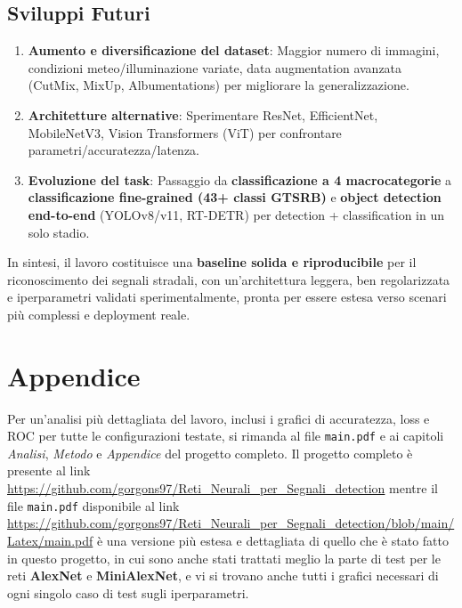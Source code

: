 \documentclass[openany,italian,12pt]{article}
\begin{document}
\subsection*{Sviluppi Futuri}
\begin{enumerate}
    \item \textbf{Aumento e diversificazione del dataset}: Maggior numero di immagini, condizioni meteo/illuminazione variate, data augmentation avanzata (CutMix, MixUp, Albumentations) per migliorare la generalizzazione.
    \item \textbf{Architetture alternative}: Sperimentare ResNet, EfficientNet, MobileNetV3, Vision Transformers (ViT) per confrontare parametri/accuratezza/latenza.
    \item \textbf{Evoluzione del task}: Passaggio da \textbf{classificazione a 4 macrocategorie} a \textbf{classificazione fine-grained (43+ classi GTSRB)} e \textbf{object detection end-to-end} (YOLOv8/v11, RT-DETR) per detection + classification in un solo stadio.
\end{enumerate}

In sintesi, il lavoro costituisce una \textbf{baseline solida e riproducibile} per il riconoscimento dei segnali stradali, con un'architettura leggera, ben regolarizzata e iperparametri validati sperimentalmente, pronta per essere estesa verso scenari più complessi e deployment reale.

\section*{Appendice}
Per un'analisi più dettagliata del lavoro, inclusi i grafici di accuratezza, loss e ROC per tutte le configurazioni testate, si rimanda al file \texttt{main.pdf} e ai capitoli \textit{Analisi}, \textit{Metodo} e \textit{Appendice} del progetto completo.
Il progetto completo è presente al link \url{https://github.com/gorgons97/Reti_Neurali_per_Segnali_detection} mentre il file \texttt{main.pdf} disponibile al link \url{https://github.com/gorgons97/Reti_Neurali_per_Segnali_detection/blob/main/Latex/main.pdf} è una versione più estesa e dettagliata di quello che è stato fatto in questo progetto, in cui sono anche stati trattati meglio la parte di test per le reti \textbf{AlexNet} e \textbf{MiniAlexNet}, e vi si trovano anche tutti i grafici necessari di ogni singolo caso di test sugli iperparametri.
\end{document}
